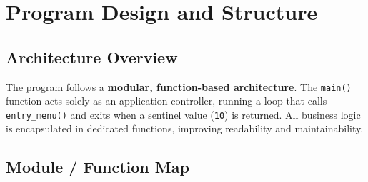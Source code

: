 \documentclass[12pt, a4paper]{article}
\begin{document}
\section{Program Design and Structure}

\subsection{Architecture Overview}

The program follows a \textbf{modular, function-based architecture}. The \texttt{main()}
function acts solely as an application controller, running a loop that calls
\texttt{entry\_menu()} and exits when a sentinel value (\texttt{10}) is returned. All
business logic is encapsulated in dedicated functions, improving readability and
maintainability.

\subsection{Module / Function Map}
\end{document}
